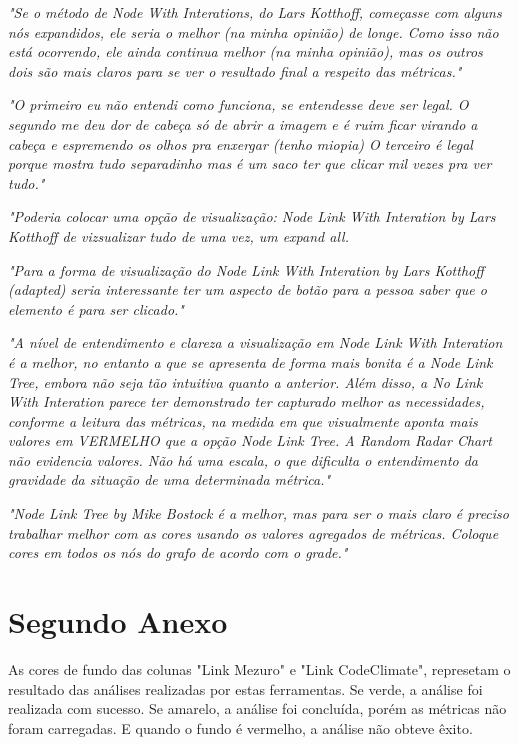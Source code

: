 \begin{anexosenv}
\textit{"Se o método de Node With Interations, do Lars Kotthoff, começasse com
alguns nós expandidos, ele seria o melhor (na minha opinião) de longe. Como
isso não está ocorrendo, ele ainda continua melhor (na minha opinião), mas os
outros dois são mais claros para se ver o resultado final a respeito das
métricas."}

\textit{"O primeiro eu não entendi como funciona, se entendesse deve ser legal. O
segundo me deu dor de cabeça só de abrir a imagem e é ruim ficar virando a
cabeça e espremendo os olhos pra enxergar (tenho miopia)  O terceiro é legal
porque mostra tudo separadinho mas é um saco ter que clicar mil vezes pra ver
tudo."}

\textit{"Poderia colocar uma opção de visualização: Node Link With Interation
by Lars Kotthoff de vizsualizar tudo de uma vez, um expand all.}

\textit{"Para a forma de visualização do Node Link With Interation by Lars
Kotthoff (adapted) seria interessante ter um aspecto de botão para a pessoa
saber que o elemento é para ser clicado."}

\textit{"A nível de entendimento e clareza a visualização em Node Link With
Interation é a melhor, no entanto a que se apresenta de forma mais bonita é a
Node Link Tree, embora não seja tão intuitiva quanto a anterior. Além disso, a
No Link With Interation parece ter demonstrado ter capturado melhor as
necessidades, conforme a leitura das métricas, na medida em que visualmente
aponta mais valores em VERMELHO que a opção Node Link Tree. A Random Radar
Chart não evidencia valores. Não há uma escala, o que dificulta
o entendimento da gravidade da situação de uma determinada métrica."}

\textit{"Node Link Tree by Mike Bostock é a melhor, mas para ser o mais claro é
preciso trabalhar melhor com as cores usando os valores agregados de métricas.
Coloque cores em todos os nós do grafo de acordo com o grade."}


\chapter{Segundo Anexo}
\label{chap:anexoB}

As cores de fundo das colunas "Link Mezuro" e "Link CodeClimate", represetam o
resultado das análises realizadas por estas ferramentas. Se verde, a análise foi
realizada com sucesso. Se amarelo, a análise foi concluída, porém as métricas
não foram carregadas. E quando o fundo é vermelho, a análise não obteve êxito.


\end{anexosenv}
